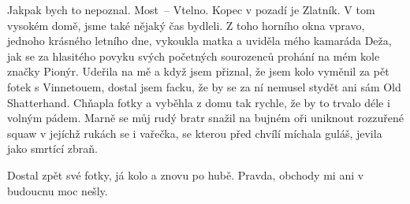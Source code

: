 
Jakpak bych to nepoznal. Most~-- Vtelno. Kopec v pozadí je Zlatník. V
tom vysokém domě, jsme také nějaký čas bydleli. Z toho horního okna
vpravo, jednoho krásného letního dne, vykoukla matka a uviděla mého
kamaráda Deža, jak se za hlasitého povyku svých početných sourozenců
prohání na mém kole značky Pionýr. Udeřila na mě a když jsem přiznal,
že jsem kolo vyměnil za pět fotek s Vinnetouem, dostal jsem facku, že
by se za ní nemusel stydět ani sám Old Shatterhand. Chňapla fotky a
vyběhla z domu tak rychle, že by to trvalo déle i volným pádem. Marně
se můj rudý bratr snažil na bujném oři uniknout rozzuřené squaw v
jejíchž rukách se i vařečka, se kterou před chvílí míchala guláš,
jevila jako smrtící zbraň.

Dostal zpět své fotky, já kolo a znovu po hubě. Pravda, obchody mi ani
v budoucnu moc nešly.

